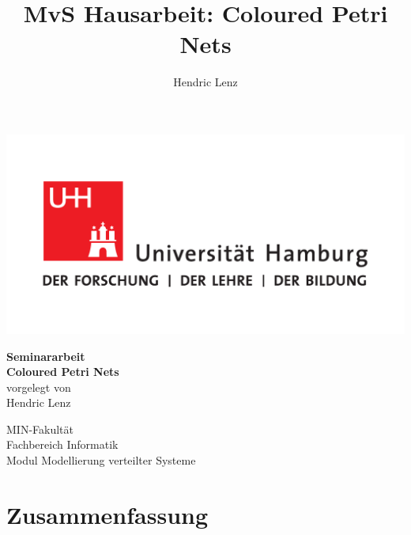 \documentclass[11pt,onecolumn,a4paper,DIV=calc]{scrartcl}
\author{Hendric Lenz}
\title{MvS Hausarbeit: Coloured Petri Nets}
\begin{document}
\begin{titlepage}
\includegraphics[scale=0.3]{UHH-Logo_2010_Farbe_CMYK.pdf}
\vspace*{1cm}
\Large
\begin{center}
{\color{uhhred}\textbf{Seminararbeit}}
\vspace*{1.5cm}\\
{\LARGE \textbf{Coloured Petri Nets}}
\vspace*{2.0cm}\\
vorgelegt von
\vspace*{0.4cm}\\
Hendric Lenz 
\end{center}
\vspace*{4.9cm}

\noindent
\large
MIN-Fakultät \vspace*{0.4cm} \\
Fachbereich Informatik \vspace*{0.4cm} \\
Modul Modellierung verteilter Systeme
\end{titlepage}


\newpage


\section*{Zusammenfassung}


\newpage
\tableofcontents
\vspace{0.5cm}
\normalsize
\newpage

\end{document}
